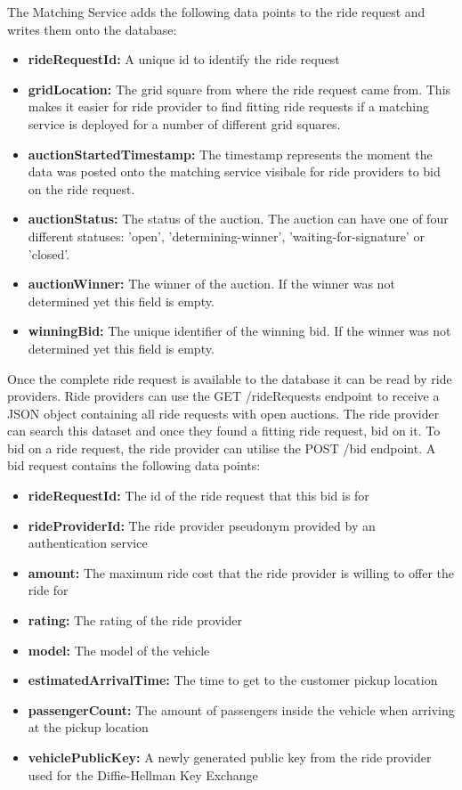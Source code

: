 The Matching Service adds the following data points to the ride request and writes them onto the database:

\begin{itemize}
    \item \textbf{rideRequestId:} A unique id to identify the ride request
    \item \textbf{gridLocation:} The grid square from where the ride request came from. This makes it easier for ride provider to find fitting ride requests if a matching service is deployed for a number of different grid squares. 
    \item \textbf{auctionStartedTimestamp:} The timestamp represents the moment the data was posted onto the matching service visibale for ride providers to bid on the ride request. 
    \item \textbf{auctionStatus:} The status of the auction. The auction can have one of four different statuses: 'open', 'determining-winner', 'waiting-for-signature' or 'closed'. 
    \item \textbf{auctionWinner:} The winner of the auction. If the winner was not determined yet this field is empty.
    \item \textbf{winningBid:} The unique identifier of the winning bid. If the winner was not determined yet this field is empty.
\end{itemize}

Once the complete ride request is available to the database it can be read by ride providers. Ride providers can use the GET /rideRequests endpoint to receive a JSON object containing all ride requests with open auctions. The ride provider can search this dataset and once they found a fitting ride request, bid on it.
To bid on a ride request, the ride provider can utilise the POST /bid endpoint. A bid request contains the following data points:

\begin{itemize}
    \item \textbf{rideRequestId:} The id of the ride request that this bid is for
    \item \textbf{rideProviderId:} The ride provider pseudonym provided by an authentication service
    \item \textbf{amount:} The maximum ride cost that the ride provider is willing to offer the ride for
    \item \textbf{rating:} The rating of the ride provider
    \item \textbf{model:} The model of the vehicle
    \item \textbf{estimatedArrivalTime:} The time to get to the customer pickup location
    \item \textbf{passengerCount:} The amount of passengers inside the vehicle when arriving at the pickup location
    \item \textbf{vehiclePublicKey:} A newly generated public key from the ride provider used for the Diffie-Hellman Key Exchange 
\end{itemize}

